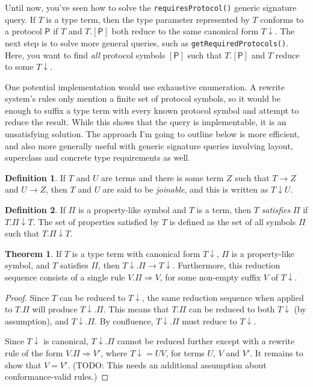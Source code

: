 \documentclass[a4paper,headsepline,bibliography=totoc,toc=flat,fleqn,twoside=semi]{scrbook}
\theoremstyle{definition}
\newtheorem{definition}{Definition}[chapter]
\theoremstyle{definition}
\theoremstyle{definition}
\newtheorem{theorem}{Theorem}[chapter]
\newcommand{\proto}[1]{\bm{\mathsf{#1}}}
\newcommand{\protosym}[1]{[\proto{#1}]}
\begin{document}
Until now, you've seen how to solve the \texttt{requiresProtocol()} generic signature
query. If $T$ is a type term, then the type parameter represented by $T$ conforms to a protocol
$\proto{P}$ if $T$ and $T.\protosym{P}$ both reduce to the same canonical form ${T}{\downarrow}$. The next
step is to solve more general queries, such as \texttt{getRequiredProtocols()}. Here, you want to find
\emph{all} protocol symbols $\protosym{P}$ such that $T.\protosym{P}$ and $T$ reduce to some
${T}{\downarrow}$.

One potential implementation would use exhaustive enumeration. A rewrite system's rules only mention a
finite set of protocol symbols, so it would be enough to suffix a type term with every known
protocol symbol and attempt to reduce the result. While this shows that the query is implementable,
it is an unsatisfying solution. The approach I'm going to outline below is more efficient, and also more generally useful with generic signature queries involving layout, superclass and concrete type requirements as well.
\begin{definition} If $T$ and $U$ are terms and there is some term $Z$ such that $T\rightarrow Z$
and $U\rightarrow Z$, then $T$ and $U$ are said to be \emph{joinable}, and this is written as $T\downarrow U$.
\end{definition}
\begin{definition}
If $\Pi$ is a property-like symbol and $T$ is a term, then $T$ \emph{satisfies} $\Pi$ if $T.\Pi\downarrow T$. The set of properties satisfied by $T$ is defined as the set of all symbols $\Pi$ such that $T.\Pi\downarrow T$.
\end{definition}

\begin{theorem}\label{propertymaptheorem} If $T$ is a type term with canonical form ${T}{\downarrow}$, $\Pi$ is a property-like
symbol, and $T$ satisfies $\Pi$, then ${T}{\downarrow}.\Pi\rightarrow{T}{\downarrow}$. Furthermore, this
reduction sequence consists of a single rule $V.\Pi\Rightarrow V$, for some non-empty suffix $V$ of ${T}{\downarrow}$.
\end{theorem}
\begin{proof}
Since $T$ can be reduced to ${T}{\downarrow}$, the same reduction sequence when applied to $T.\Pi$ will
produce ${T}{\downarrow}.\Pi$. This means that $T.\Pi$ can be reduced to both ${T}{\downarrow}$ (by
assumption), and ${T}{\downarrow}.\Pi$. By confluence, ${T}{\downarrow}.\Pi$ must reduce to ${T}{\downarrow}$.

Since ${T}{\downarrow}$ is canonical, ${T}{\downarrow}.\Pi$ cannot be reduced further except with a rewrite rule
of the form $V.\Pi\Rightarrow V'$, where ${T}{\downarrow}=UV$, for terms $U$, $V$ and $V'$. It remains to show
that $V=V'$. (TODO: This needs an additional assumption about conformance-valid rules.)
\end{proof}
\end{document}
